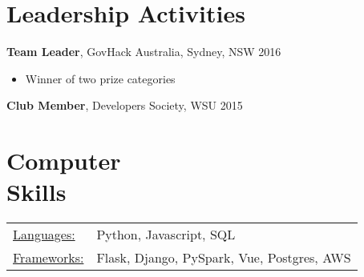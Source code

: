 \documentclass[margin]{res}
\begin{document}
\begin{resume}
\section{Leadership   Activities}
               {\bf Team Leader}, GovHack Australia, Sydney, NSW    \hfill        2016
                \begin{itemize} \itemsep -2pt
              	\item Winner of two prize categories
		\end{itemize}

		{\bf Club Member}, Developers Society, WSU \hfill   2015

\section{Computer \\ Skills}
   \begin{tabular}{l p{3in}}
    \underline{Languages:} & Python, Javascript, SQL \\
	\underline{Frameworks:} &  Flask, Django, PySpark, Vue, Postgres, AWS\\
 \end{tabular}

\end{resume}
\end{document}
